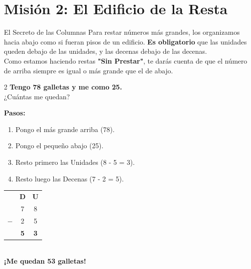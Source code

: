\documentclass[12pt, letterpaper]{article}
\begin{document}
	
	
	\section*{Misión 2: El Edificio de la Resta}
	
	\begin{concepto}{El Secreto de las Columnas}
		Para restar números más grandes, los organizamos hacia abajo como si fueran pisos de un edificio. \textbf{Es obligatorio} que las unidades queden debajo de las unidades, y las decenas debajo de las decenas.
		\\[0.2cm]
		Como estamos haciendo restas \textbf{"Sin Prestar"}, te darás cuenta de que el número de arriba siempre es igual o más grande que el de abajo.
	\end{concepto}
	
	\begin{ejemplo}
		\begin{multicols}{2}
			\textbf{Tengo 78 galletas y me como 25.}
			\\ ¿Cuántas me quedan?
			
			\vspace{0.4cm}
			\textbf{Pasos:}
			\begin{enumerate}
				\item Pongo el más grande arriba (78).
				\item Pongo el pequeño abajo (25).
				\item Resto primero las Unidades (8 - 5 = 3).
				\item Resto luego las Decenas (7 - 2 = 5).
			\end{enumerate}
			
			\columnbreak
			
			\begin{center}
				\Large
				\begin{tabular}{r c c}
					& \textbf{D} & \textbf{U} \\
					& 7 & 8 \\
					$-$ & 2 & 5 \\
					\hline
					& \textbf{5} & \textbf{3}
				\end{tabular}
				\\[0.4cm]
				\normalsize \textbf{¡Me quedan 53 galletas!}
			\end{center}
		\end{multicols}
	\end{ejemplo}
	
\end{document}
